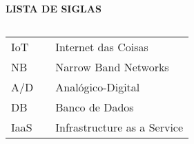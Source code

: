 \newpage

\begin{center}
\textbf{LISTA DE SIGLAS}
\end{center}
$\!$\\

\begin{tabular}{lll}
IoT & \hspace{1cm} & Internet das Coisas \\
NB &\hspace{1cm} &  Narrow Band Networks \\
A/D & \hspace{1cm} & Analógico-Digital \\
DB &  \hspace{1cm} & Banco de Dados \\
IaaS & \hspace{1cm} & Infrastructure as a Service \\
\end{tabular}
